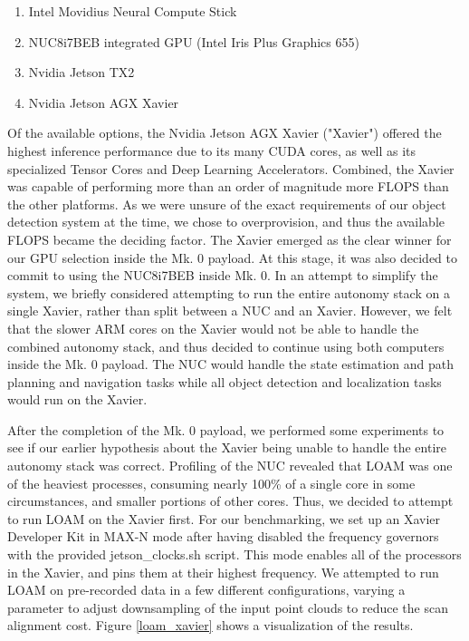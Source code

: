 \begin{enumerate}
	\item Intel Movidius Neural Compute Stick
	\item NUC8i7BEB integrated GPU (Intel Iris Plus Graphics 655)
	\item Nvidia Jetson TX2
	\item Nvidia Jetson AGX Xavier
\end{enumerate}

Of the available options, the Nvidia Jetson AGX Xavier ("Xavier") offered the highest inference performance due to its many CUDA cores, as well as its specialized Tensor Cores and Deep Learning Accelerators. Combined, the Xavier was capable of performing more than an order of magnitude more FLOPS than the other platforms. As we were unsure of the exact requirements of our object detection system at the time, we chose to overprovision, and thus the available FLOPS became the deciding factor. The Xavier emerged as the clear winner for our GPU selection inside the Mk. 0 payload. At this stage, it was also decided to commit to using the NUC8i7BEB inside Mk. 0. In an attempt to simplify the system, we briefly considered attempting to run the entire autonomy stack on a single Xavier, rather than split between a NUC and an Xavier. However, we felt that the slower ARM cores on the Xavier would not be able to handle the combined autonomy stack, and thus decided to continue using both computers inside the Mk. 0 payload. The NUC would handle the state estimation and path planning and navigation tasks while all object detection and localization tasks would run on the Xavier.

After the completion of the Mk. 0 payload, we performed some experiments to see if our earlier hypothesis about the Xavier being unable to handle the entire autonomy stack was correct. Profiling of the NUC revealed that LOAM was one of the heaviest processes, consuming nearly 100\% of a single core in some circumstances, and smaller portions of other cores. Thus, we decided to attempt to run LOAM on the Xavier first. For our benchmarking, we set up an Xavier Developer Kit in MAX-N mode after having disabled the frequency governors with the provided jetson\_clocks.sh script. This mode enables all of the processors in the Xavier, and pins them at their highest frequency. We attempted to run LOAM on pre-recorded data in a few different configurations, varying a parameter to adjust downsampling of the input point clouds to reduce the scan alignment cost. Figure \ref{loam_xavier} shows a visualization of the results.

